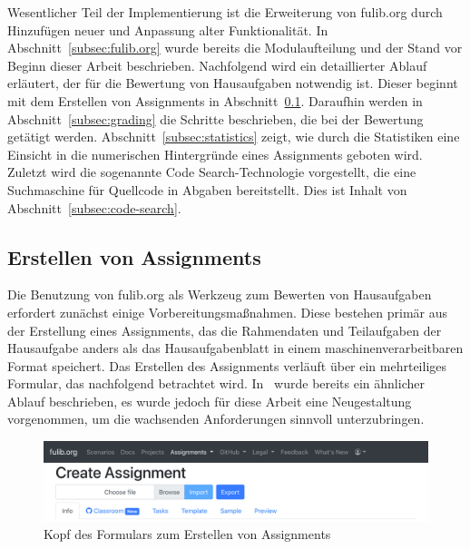 Wesentlicher Teil der Implementierung ist die Erweiterung von fulib.org durch Hinzufügen neuer und Anpassung alter Funktionalität.
In Abschnitt~\ref{subsec:fulib.org} wurde bereits die Modulaufteilung und der Stand vor Beginn dieser Arbeit beschrieben.
Nachfolgend wird ein detaillierter Ablauf erläutert, der für die Bewertung von Hausaufgaben notwendig ist.
Dieser beginnt mit dem Erstellen von Assignments in Abschnitt~\ref{subsec:creating-assignments}.
Daraufhin werden in Abschnitt~\ref{subsec:grading} die Schritte beschrieben, die bei der Bewertung getätigt werden.
Abschnitt~\ref{subsec:statistics} zeigt, wie durch die Statistiken eine Einsicht in die numerischen Hintergründe eines Assignments geboten wird.
Zuletzt wird die sogenannte Code Search-Technologie vorgestellt, die eine Suchmaschine für Quellcode in Abgaben bereitstellt.
Dies ist Inhalt von Abschnitt~\ref{subsec:code-search}.

\subsection{Erstellen von Assignments}\label{subsec:creating-assignments}

Die Benutzung von fulib.org als Werkzeug zum Bewerten von Hausaufgaben erfordert zunächst einige Vorbereitungsmaßnahmen.
Diese bestehen primär aus der Erstellung eines Assignments, das die Rahmendaten und Teilaufgaben der Hausaufgabe anders als das Hausaufgabenblatt in einem maschinenverarbeitbaren Format speichert.
Das Erstellen des Assignments verläuft über ein mehrteiliges Formular, das nachfolgend betrachtet wird.
In~\cite{bachelor-thesis} wurde bereits ein ähnlicher Ablauf beschrieben, es wurde jedoch für diese Arbeit eine Neugestaltung vorgenommen, um die wachsenden Anforderungen sinnvoll unterzubringen.

\begin{figure}
    \centering
    \includegraphics[width=\textwidth]{images/assignment-create-head}
    \caption{Kopf des Formulars zum Erstellen von Assignments}
    \label{fig:assignment-create-head}
\end{figure}

